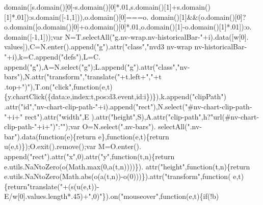 \begin{DoxyCode}
      domain([s.domain()[0]-s.domain()[0]*.01,s.domain()[1]+s.domain()[1]*.01]):s.domain([-1,1])),o.domain()[0]===o.
      domain()[1]&&(o.domain()[0]?o.domain([o.domain()[0]+o.domain()[0]*.01,o.domain()[1]-o.domain()[1]*.01]):o.
      domain([-1,1]));var N=T.selectAll(\textcolor{stringliteral}{"g.nv-wrap.nv-historicalBar-"}+i).data([w[0].
      values]),C=N.enter().append(\textcolor{stringliteral}{"g"}).attr(\textcolor{stringliteral}{"class"},\textcolor{stringliteral}{"nvd3 nv-wrap nv-historicalBar-"}+i),k=C.append(\textcolor{stringliteral}{"defs"}),L=C.
      append(\textcolor{stringliteral}{"g"}),A=N.select(\textcolor{stringliteral}{"g"});L.append(\textcolor{stringliteral}{"g"}).attr(\textcolor{stringliteral}{"class"},\textcolor{stringliteral}{"nv-bars"}),N.attr(\textcolor{stringliteral}{"transform"},\textcolor{stringliteral}{"translate("}+t.left+\textcolor{stringliteral}{","}+t
      .top+\textcolor{stringliteral}{")"}),T.on(\textcolor{stringliteral}{"click"},\textcolor{keyword}{function}(e,t)\{y.chartClick(\{data:e,index:t,pos:d3.event,\textcolor{keywordtype}{id}:i\})\}),k.append(\textcolor{stringliteral}{"clipPath"})
      .attr(\textcolor{stringliteral}{"id"},\textcolor{stringliteral}{"nv-chart-clip-path-"}+i).append(\textcolor{stringliteral}{"rect"}),N.select(\textcolor{stringliteral}{"#nv-chart-clip-path-"}+i+\textcolor{stringliteral}{" rect"}).attr(\textcolor{stringliteral}{"width"},E
      ).attr(\textcolor{stringliteral}{"height"},S),A.attr(\textcolor{stringliteral}{"clip-path"},h?\textcolor{stringliteral}{"url(#nv-chart-clip-path-"}+i+\textcolor{stringliteral}{")"}:\textcolor{stringliteral}{""});var O=N.select(\textcolor{stringliteral}{".nv-bars"}).
      selectAll(\textcolor{stringliteral}{".nv-bar"}).data(\textcolor{keyword}{function}(e)\{\textcolor{keywordflow}{return} e\},\textcolor{keyword}{function}(e,t)\{\textcolor{keywordflow}{return} u(e,t)\});O.exit().remove();var M=O.enter().
      append(\textcolor{stringliteral}{"rect"}).attr(\textcolor{stringliteral}{"x"},0).attr(\textcolor{stringliteral}{"y"},\textcolor{keyword}{function}(t,n)\{\textcolor{keywordflow}{return} e.utils.NaNtoZero(o(Math.max(0,a(t,n))))\}).
      attr(\textcolor{stringliteral}{"height"},\textcolor{keyword}{function}(t,n)\{\textcolor{keywordflow}{return} e.utils.NaNtoZero(Math.abs(o(a(t,n))-o(0)))\}).attr(\textcolor{stringliteral}{"transform"},\textcolor{keyword}{function}(
      e,t)\{\textcolor{keywordflow}{return}\textcolor{stringliteral}{"translate("}+(s(u(e,t))-E/w[0].values.length*.45)+\textcolor{stringliteral}{",0)"}\}).on(\textcolor{stringliteral}{"mouseover"},\textcolor{keyword}{function}(e,t)\{\textcolor{keywordflow}{if}(!b)\textcolor{keywordflow}{
}
\end{DoxyCode}
